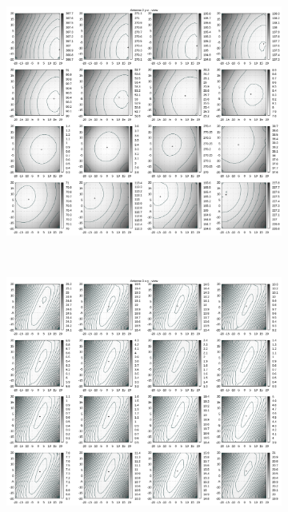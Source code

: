 \begin{appendix}
\begin{figure}[!ht]
\begin{subfigure}[t]{0.3\textwidth}
	\end{subfigure}
	\begin{subfigure}[t]{0.3\textwidth}
			\centering
	   \includegraphics[width=\textwidth]{img/fitness/yz/a2.png}
	\end{subfigure}
\\
	\centering
	\begin{subfigure}[t]{0.3\textwidth}
	     \centering
	     \includegraphics[width=\textwidth]{img/fitness/xy/a3.png}

\end{subfigure}
\end{figure}
\end{appendix}

